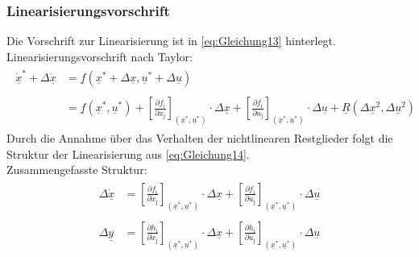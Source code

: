 \subsubsection{Linearisierungsvorschrift}
\label{sec:Linearisierungsvorschrift}
Die Vorschrift zur Linearisierung ist in \autoref{eq:Gleichung13} hinterlegt.\\
\newline
Linearisierungsvorschrift nach Taylor:
\begin{align}
    \begin{split}
        \dot{\underline{x}}^{*}+\Delta{\dot{\underline{x}}} &=\underline{f}(\underline{x}^{*}+\Delta{\underline{x}},\underline{u}^{*}+\Delta{\underline{u}})\\\\
        &=\underline{f}(\underline{x}^{*},\underline{u}^{*})+\left[\frac{\partial f_{\mathrm{i}}}{\partial x_{\mathrm{j}}}\right]_{(\underline{x}^{*}, \underline{u}^{*})}\cdot\Delta{\underline{x}}+\left[\frac{\partial f_{\mathrm{i}}}{\partial u_{\mathrm{j}}}\right]_{(\underline{x}^{*},\underline{u}^{*})}\cdot\Delta{\underline{u}}+\underline{R}(\Delta{\underline{x}^2}, \Delta{\underline{u}^2})
    \end{split}
    \label{eq:Gleichung13}
\end{align}
\newline
Durch die Annahme über das Verhalten der nichtlinearen Restglieder folgt die Struktur der Linearisierung aus \autoref{eq:Gleichung14}.\\
\newline
Zusammengefasste Struktur:
\begin{align}
    \begin{split}
        \Delta\dot{\underline{x}} &= \left[\frac{\partial f_{\mathrm{i}}}{\partial x_{\mathrm{j}}}\right]_{(\underline{x}^{*}, \underline{u}^{*})}\cdot\Delta{\underline{x}}+\left[\frac{\partial f_{\mathrm{i}}}{\partial u_{\mathrm{j}}}\right]_{(\underline{x}^{*},\underline{u}^{*})}\cdot\Delta{\underline{u}}\\\\
        \Delta{\underline{y}} &= \left[\frac{\partial h_{\mathrm{i}}}{\partial x_{\mathrm{j}}}\right]_{(\underline{x}^{*}, \underline{u}^{*})}\cdot\Delta{\underline{x}}+\left[\frac{\partial h_{\mathrm{i}}}{\partial u_{\mathrm{j}}}\right]_{(\underline{x}^{*},\underline{u}^{*})}\cdot\Delta{\underline{u}}
    \end{split}
    \label{eq:Gleichung14}
\end{align}

